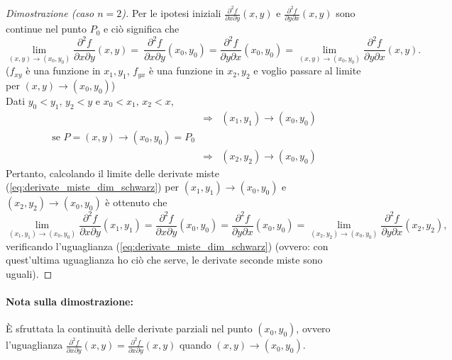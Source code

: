 \begin{proof}[Dimostrazione (caso $n=2$)]
	\noindent Per le ipotesi iniziali $\frac{\partial^2 f}{\partial x\partial y}(x,y)$ e $\frac{\partial^2 f}{\partial y\partial x}(x,y)$ sono continue nel punto $P_0$ e ciò significa che
	\begin{equation*}
		\lim\limits_{(x,y)\rightarrow(x_0,y_0)}  \frac{\partial^2 f}{\partial x\partial y}(x,y) = \ \frac{\partial^2 f}{\partial x\partial y}(x_0,y_0) = \frac{\partial^2 f}{\partial y\partial x}(x_0,y_0) =\lim\limits_{(x,y)\rightarrow(x_0,y_0)}  \frac{\partial^2 f}{\partial y\partial x}(x,y).
	\end{equation*}
	($f_{xy}$ è una funzione in $x_1,y_1$, $f_{yx}$ è una funzione in $x_2,y_2$ e voglio passare al limite per $(x,y)\rightarrow(x_0,y_0)$)\\
	Dati $y_0<y_1,\, y_2 < y$ e $x_0<x_1,\, x_2 < x$,
	\begin{equation*}
		\begin{matrix}
			&\Rightarrow& (x_1,y_1) \rightarrow (x_0,y_0)\\
			\text{se }P=(x,y) \rightarrow (x_0,y_0) = P_0  &&\\
			&\Rightarrow& (x_2,y_2)\rightarrow (x_0,y_0)
		\end{matrix}
	\end{equation*}
	Pertanto, calcolando il limite delle derivate miste (\ref{eq:derivate_miste_dim_schwarz}) per $(x_1,y_1) \rightarrow (x_0,y_0)$ e $(x_2,y_2)\rightarrow (x_0,y_0)$ è ottenuto che
	\begin{equation*}
		\lim\limits_{(x_1,y_1) \rightarrow (x_0,y_0)} \frac{\partial^2 f}{\partial x\partial y}(x_1,y_1) = \frac{\partial^2 f}{\partial x\partial y}(x_0,y_0) =  \frac{\partial^2 f}{\partial y\partial x}(x_0,y_0) =  \lim\limits_{(x_2,y_2)\rightarrow (x_0,y_0)} \frac{\partial^2 f}{\partial y\partial x}(x_2,y_2),
	\end{equation*}
	verificando l'uguaglianza (\ref{eq:derivate_miste_dim_schwarz})	(ovvero: con quest'ultima uguaglianza ho ciò che serve, le derivate seconde miste sono uguali).
\end{proof}

\paragraph{Nota sulla dimostrazione:} È sfruttata la continuità delle derivate parziali nel punto $(x_0,y_0)$, ovvero l'uguaglianza $\frac{\partial^2 f}{\partial x\partial y}(x,y) = \frac{\partial^2 f}{\partial x\partial y}(x,y)$ quando $(x,y)\rightarrow(x_0,y_0)$. 

